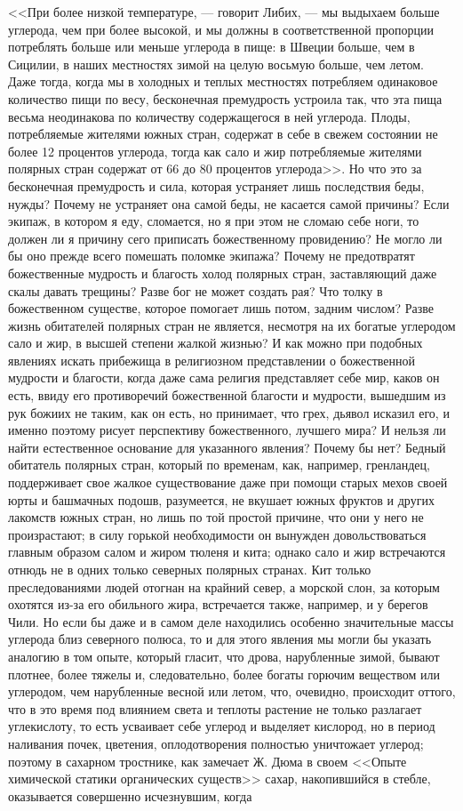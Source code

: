 \documentclass[12pt]{article}
\begin{document}
<<При более низкой температуре, --- говорит Либих, --- мы выдыхаем больше углерода, чем при более высокой, и мы должны в соответственной пропорции потреблять больше или меньше углерода в пище: в Швеции больше, чем в Сицилии, в наших местностях зимой на целую восьмую больше, чем летом. Даже тогда, когда мы в холодных и теплых местностях потребляем одинаковое количество пищи по весу, бесконечная премудрость устроила так, что эта пища весьма неодинакова по количеству содержащегося в ней углерода. Плоды, потребляемые жителями южных стран, содержат в себе в свежем состоянии не более 12 процентов углерода, тогда как сало и жир потребляемые жителями полярных стран содержат от 66 до 80 процентов углерода>>. Но что это за бесконечная премудрость и сила, которая устраняет лишь последствия беды, нужды? Почему не устраняет она самой беды, не касается самой причины? Если экипаж, в котором я еду, сломается, но я при этом не сломаю себе ноги, то должен ли я причину сего приписать божественному провидению? Не могло ли бы оно прежде всего помешать поломке экипажа? Почему не предотвратят божественные мудрость и благость холод полярных стран, заставляющий даже скалы давать трещины? Разве бог не может создать рая? Что толку в божественном существе, которое помогает лишь потом, задним числом? Разве жизнь обитателей полярных стран не является, несмотря на их богатые углеродом сало и жир, в высшей степени жалкой жизнью? И как можно при подобных явлениях искать прибежища в религиозном представлении о божественной мудрости и благости, когда даже сама религия представляет себе мир, каков он есть, ввиду его противоречий божественной благости и мудрости, вышедшим из рук божиих не таким, как он есть, но принимает, что грех, дьявол исказил его, и именно поэтому рисует перспективу божественного, лучшего мира? И нельзя ли найти естественное основание для указанного явления? Почему бы нет? Бедный обитатель полярных стран, который по временам, как, например, гренландец, поддерживает свое жалкое существование даже при помощи старых мехов своей юрты и башмачных подошв, разумеется, не вкушает южных фруктов и других лакомств южных стран, но лишь по той простой причине, что они у него не произрастают; в силу горькой необходимости он вынужден довольствоваться главным образом салом и жиром тюленя и кита; однако сало и жир встречаются отнюдь не в одних только северных полярных странах. Кит только преследованиями людей отогнан на крайний север, а морской слон, за которым охотятся из-за его обильного жира, встречается также, например, и у берегов Чили. Но если бы даже и в самом деле находились особенно значительные массы углерода близ северного полюса, то и для этого явления мы могли бы указать аналогию в том опыте, который гласит, что дрова, нарубленные зимой, бывают плотнее, более тяжелы и, следовательно, более богаты горючим веществом или углеродом, чем нарубленные весной или летом, что, очевидно, происходит оттого, что в это время под влиянием света и теплоты растение не только разлагает углекислоту, то есть усваивает себе углерод и выделяет кислород, но в период наливания почек, цветения, оплодотворения полностью уничтожает углерод; поэтому в сахарном тростнике, как замечает Ж. Дюма в своем <<Опыте химической статики органических существ>>  сахар, накопившийся в стебле, оказывается совершенно исчезнувшим, когда 
\end{document}
